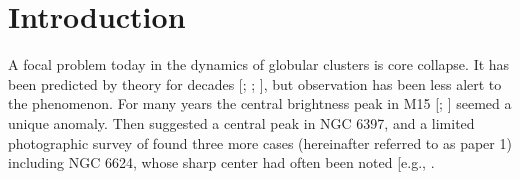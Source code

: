 
\begin{abstract}
This tutorial includes codes and explanations which will not print in 
an ordinary \LaTeX\ document.  In order to use this tutorial you should 
view or print it using an editor or word processing program.  Also 
included are samples of marked-up equations, tables, and figure captions, 
with some hints on how to use them.
\end{abstract}



\section{Introduction}

A focal problem today in the dynamics of globular clusters 
is core collapse.  It has been predicted by theory for decades 
[; ; ], but observation has 
been less alert to the phenomenon.  For many years the central 
brightness peak in M15 [; ] seemed a unique anomaly.  Then 
 suggested a central peak 
in NGC 6397, and a limited photographic survey of  found three more cases (hereinafter 
referred to as paper 1) including NGC 6624, whose sharp center 
had often been noted [e.g., \markcite{{\it Canizares et al.,} 1978]}.

